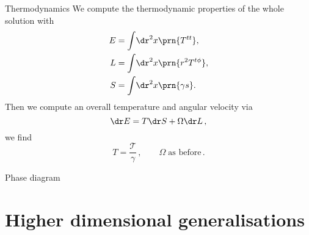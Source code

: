 \documentclass{beamer}
\newcommand{\tloc}{\mathcal{T}}
\begin{document}

\begin{frame}{Thermodynamics}
%
 We compute the thermodynamic properties of the whole solution with
 \begin{equation*}
   \begin{split}
     E &= \int\!\dr^2x \prn{ T^{tt}}, \\
     L &= \int\!\dr^2x \prn{ r^2 T^{t\phi}}, \\
     S &= \int\!\dr^2x \prn{ \gamma s }.
   \end{split}
 \end{equation*}
 Then we compute an overall temperature and angular velocity via
 \begin{equation*}
   \dr E = T \dr S + \Omega \dr L\,,
 \end{equation*}
 we find
 \begin{equation*}
   T = \frac{\tloc}{\gamma}\,, \qquad \Omega \;\text{as before}\,.
 \end{equation*}
%
\end{frame}


\begin{frame}{Phase diagram}
%
  \begin{center}
  
  \end{center}
%
\end{frame}


\section{Higher dimensional generalisations}

\end{document}
